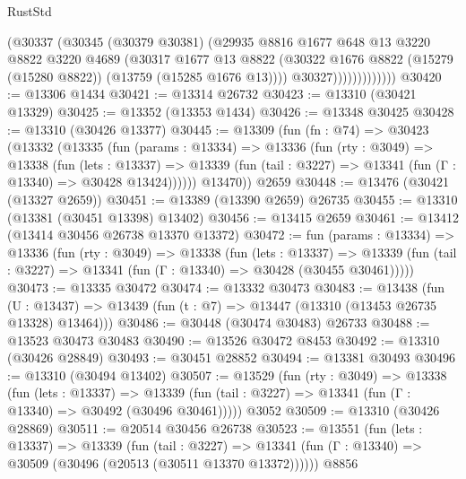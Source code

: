 \begin{lexlean}{RustStd}
\begin{coremodule}
                        (@30337
                          (@30345
                            (@30379 @30381)
                            (@29935
                              @8816
                              @1677
                              @648
                              @13
                              @3220
                              @8822
                              @3220
                              @4689
                              (@30317
                                @1677
                                @13
                                @8822
                                (@30322
                                  @1676
                                  @8822
                                  (@15279 (@15280 @8822))
                                  (@13759 (@15285 @1676 @13))))
                              @30327)))))))))))))
@30420 := @13306 @1434
@30421 := @13314 @26732
@30423 := @13310 (@30421 @13329)
@30425 := @13352 (@13353 @1434)
@30426 := @13348 @30425
@30428 := @13310 (@30426 @13377)
@30445 := @13309
    (fun (fn : @74) =>
    @30423
      (@13332
        (@13335
          (fun (params : @13334) =>
          @13336
            (fun (rty : @3049) =>
            @13338
              (fun (lets : @13337) =>
              @13339 (fun (tail : @3227) => @13341 (fun (Γ : @13340) => @30428 @13424))))))
        @13470))
    @2659
@30448 := @13476 (@30421 (@13327 @2659))
@30451 := @13389 (@13390 @2659) @26735
@30455 := @13310 (@13381 (@30451 @13398) @13402)
@30456 := @13415 @2659
@30461 := @13412 (@13414 @30456 @26738 @13370 @13372)
@30472 := fun (params : @13334) =>
  @13336
    (fun (rty : @3049) =>
    @13338
      (fun (lets : @13337) =>
      @13339 (fun (tail : @3227) => @13341 (fun (Γ : @13340) => @30428 (@30455 @30461)))))
@30473 := @13335 @30472
@30474 := @13332 @30473
@30483 := @13438
    (fun (U : @13437) => @13439 (fun (t : @7) => @13447 (@13310 (@13453 @26735 @13328) @13464)))
@30486 := @30448 (@30474 @30483) @26733
@30488 := @13523 @30473 @30483
@30490 := @13526 @30472 @8453
@30492 := @13310 (@30426 @28849)
@30493 := @30451 @28852
@30494 := @13381 @30493
@30496 := @13310 (@30494 @13402)
@30507 := @13529
    (fun (rty : @3049) =>
    @13338
      (fun (lets : @13337) =>
      @13339 (fun (tail : @3227) => @13341 (fun (Γ : @13340) => @30492 (@30496 @30461)))))
    @3052
@30509 := @13310 (@30426 @28869)
@30511 := @20514 @30456 @26738
@30523 := @13551
    (fun (lets : @13337) =>
    @13339
      (fun (tail : @3227) =>
      @13341 (fun (Γ : @13340) => @30509 (@30496 (@20513 (@30511 @13370 @13372))))))
    @8856

\end{coremodule}
\end{lexlean}
